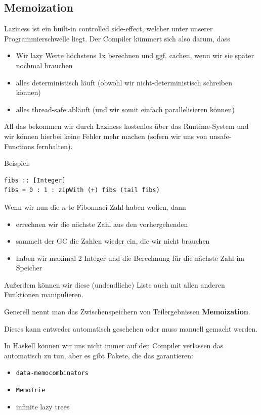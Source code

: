 \documentclass{beamer}
\begin{document}
\subsection{Memoization}

\begin{frame}
Laziness ist ein \glqq built-in controlled side-effect\grqq , welcher unter unserer Programmierschwelle liegt. Der Compiler kümmert sich also darum, dass\pause
\begin{itemize}
 \item Wir lazy Werte höchstens 1x berechnen und ggf. cachen, wenn wir sie später nochmal brauchen
 \item alles deterministisch läuft (obwohl wir nicht-deterministisch schreiben können)
 \item alles thread-safe abläuft (und wir somit einfach parallelisieren können)
\end{itemize}
\pause
All das bekommen wir durch Laziness kostenlos über das Runtime-System und wir können hierbei keine Fehler mehr machen (sofern wir uns von unsafe-Functions fernhalten).
\end{frame}

\begin{frame}[fragile]
Beispiel:
\begin{verbatim}
fibs :: [Integer]
fibs = 0 : 1 : zipWith (+) fibs (tail fibs)
\end{verbatim}
\pause
Wenn wir nun die $n$-te Fibonnaci-Zahl haben wollen, dann
\begin{itemize}
 \item errechnen wir die nächste Zahl aus den vorhergehenden
 \pause
 \item sammelt der GC die Zahlen wieder ein, die wir nicht brauchen
 \pause
 \item haben wir maximal 2 Integer und die Berechnung für die nächste Zahl im Speicher
\end{itemize}
\pause
Außerdem können wir diese (undendliche) Liste auch mit allen anderen Funktionen manipulieren.
\end{frame}

\begin{frame}[fragile]
Generell nennt man das Zwischenspeichern von Teilergebnissen \textbf{Memoization}.\\\par\pause
Dieses kann entweder automatisch geschehen oder muss manuell gemacht werden.\\\par\pause
In Haskell können wir uns nicht immer auf den Compiler verlassen das automatisch zu tun, aber es gibt Pakete, die das garantieren:
\begin{itemize}
 \item \texttt{data-memocombinators}
 \item \texttt{MemoTrie}
 \item infinite lazy trees
\end{itemize}
\end{frame}
\end{document}
